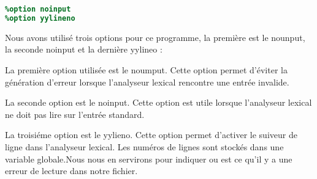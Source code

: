 \lstset{style=mystyle}
\begin{lstlisting}[language=Lex, caption=Option Lex du projet]
%option nounput
%option noinput
%option yylineno
\end{lstlisting}

Nous avons utilisé trois options pour ce programme, la première est le nounput, la seconde noinput et la dernière yylineo :

La première option utilisée est le noumput. Cette option permet d'éviter la génération d'erreur lorsque l'analyseur lexical rencontre une entrée invalide.

La seconde option est le noinput. Cette option est utile lorsque l'analyseur lexical ne doit pas lire sur l'entrée standard.

La troisiéme option est le yylieno. Cette option permet d'activer le suiveur de ligne dans l'analyseur lexical. Les numéros de lignes sont stockés dans une variable globale.Nous nous en servirons pour indiquer ou est ce qu'il y a une erreur de lecture dans notre fichier.